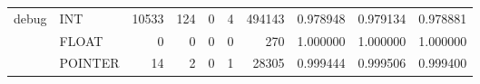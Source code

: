 \begin{table}
\begin{tabular}{llrrrrrrrr}
\cline{1-10}
\multirow{3}{*}{debug} & INT &                              10533 &                               124 &                                0 &                                 4 &                          494143 &                        0.978948 &                               0.979134 &                             0.978881 \\
      & FLOAT &                                  0 &                                 0 &                                0 &                                 0 &                             270 &                        1.000000 &                               1.000000 &                             1.000000 \\
      & POINTER &                                 14 &                                 2 &                                0 &                                 1 &                           28305 &                        0.999444 &                               0.999506 &                             0.999400 \\
\bottomrule
\end{tabular}
\end{table}
